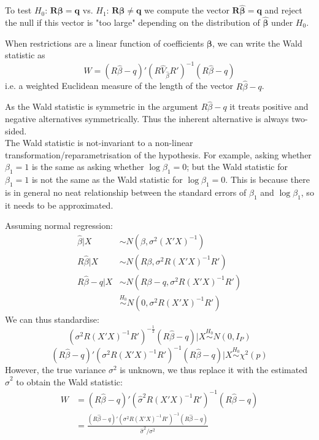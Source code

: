 \documentclass[DIV=14,titlepage=false]{scrreprt}
\begin{document}
To test $H_0$: $\boldsymbol{R\beta}=\boldsymbol{q}$ vs. $H_1$: $\boldsymbol{R\beta}\not = \boldsymbol{q}$ we compute the vector $\boldsymbol{R \hat \beta}=\boldsymbol{q}$ and reject the null if this vector is "too large" depending on the distribution of $\boldsymbol{\hat\beta}$ under $H_0$. 

\begin{definition}
    When restrictions are a linear function of coefficients $\boldsymbol{\beta}$, we can write the Wald statistic as \[W = (R\hat \beta-q)'(R\hat V_{\hat\beta}R')^{-1}(R\hat \beta-q) \] i.e. a weighted Euclidean measure of the length of the vector $R\hat \beta-q$.
\end{definition}
\begin{note}
    As the Wald statistic is symmetric in the argument $R\hat \beta-q$ it treats positive and negative alternatives symmetrically. Thus the inherent alternative is always two-sided.\\
    The Wald statistic is not-invariant to a non-linear transformation/reparametrisation of the hypothesis. For example, asking whether $\beta_1 = 1$ is the same as asking whether $\log \beta_1 = 0$; but the Wald statistic for $\beta_1 = 1$ is not the same as the Wald statistic for $\log \beta_1 = 0$. This is because there is in general no neat relationship between the standard errors of $\beta_1$ and $\log \beta_1$, so it needs to be approximated.
\end{note}

Assuming normal regression:
\begin{align*}
\hat\beta|X &\sim N(\beta, \sigma^2(X'X)^{-1})\\
R \hat\beta|X &\sim N(R\beta, \sigma^2R(X'X)^{-1}R')\\
R \hat\beta-q|X &\sim N(R\beta-q, \sigma^2R(X'X)^{-1}R')\\ 
&\overset{H_0}{\sim} N(0, \sigma^2R(X'X)^{-1}R')
\end{align*}
We can thus standardise:
\[
    (\sigma^2R(X'X)^{-1}R')^{-\frac{1}{2}}(R \hat\beta-q)|X \overset{H_0}{\sim} N(0, I_P)
\]
\begin{equation}
    (R \hat\beta-q)'(\sigma^2R(X'X)^{-1}R')^{-1}(R \hat\beta-q)|X \overset{H_0}{\sim} \chi^2(p)  
    \label{eq:WaldStatistic}
\end{equation}
However, the true variance $\sigma^2$ is unknown, we thus replace it with the estimated $\hat \sigma^2$ to obtain the Wald statistic:
\begin{align*}
    W &= (R \hat\beta-q)'(\hat \sigma^2R(X'X)^{-1}R')^{-1}(R \hat\beta-q)\\
    &= \frac{(R \hat\beta-q)'(\sigma^2R(X'X)^{-1}R')^{-1}(R \hat\beta-q)}{\hat\sigma^2/\sigma^2}
\end{align*}
\end{document}
